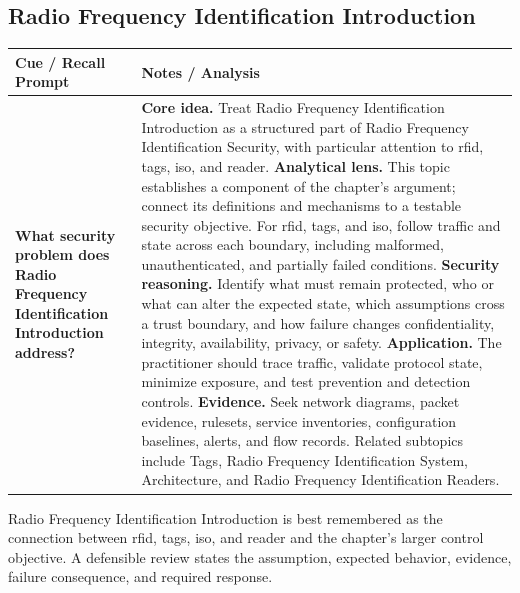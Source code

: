 \documentclass[11pt]{article}
\newcommand{\CornellHeader}{%
\rowcolor{Navy}\color{white}\bfseries Cue / Recall Prompt & \color{white}\bfseries Notes / Analysis\\\hline}
\newcommand{\CornellRow}[2]{%
\cellcolor{CueGray}\RaggedRight\textbf{#1} & \RaggedRight #2\\\hline}
\begin{document}
\subsection*{Radio Frequency Identification Introduction}
\begin{longtable}{>{\RaggedRight\arraybackslash}p{}|>{\RaggedRight\arraybackslash}p{}}
\CornellHeader
\CornellRow{What security problem does Radio Frequency Identification Introduction address?}{\textbf{Core idea.} Treat Radio Frequency Identification Introduction as a structured part of Radio Frequency Identification Security, with particular attention to rfid, tags, iso, and reader. \textbf{Analytical lens.} This topic establishes a component of the chapter's argument; connect its definitions and mechanisms to a testable security objective. For rfid, tags, and iso, follow traffic and state across each boundary, including malformed, unauthenticated, and partially failed conditions. \textbf{Security reasoning.} Identify what must remain protected, who or what can alter the expected state, which assumptions cross a trust boundary, and how failure changes confidentiality, integrity, availability, privacy, or safety. \textbf{Application.} The practitioner should trace traffic, validate protocol state, minimize exposure, and test prevention and detection controls. \textbf{Evidence.} Seek network diagrams, packet evidence, rulesets, service inventories, configuration baselines, alerts, and flow records. Related subtopics include Tags, Radio Frequency Identification System, Architecture, and Radio Frequency Identification Readers.}
\end{longtable}
\begin{topicsummary}
Radio Frequency Identification Introduction is best remembered as the connection between rfid, tags, iso, and reader and the chapter's larger control objective. A defensible review states the assumption, expected behavior, evidence, failure consequence, and required response.
\end{topicsummary}
\end{document}
